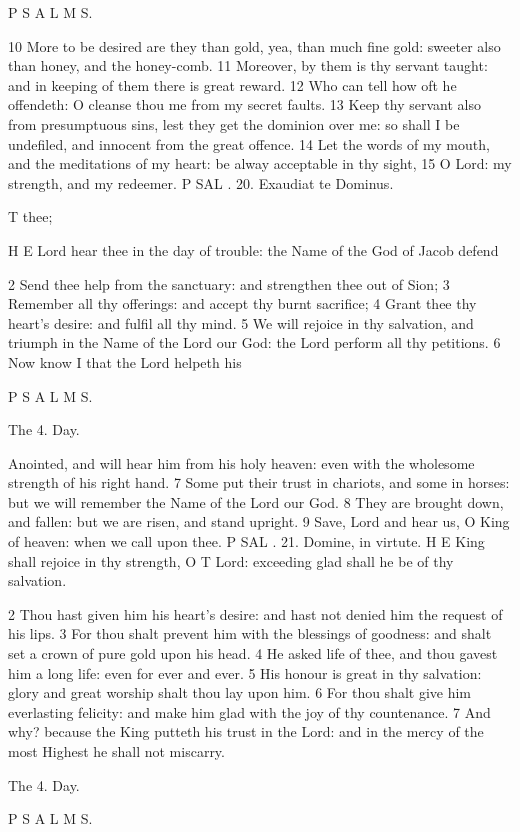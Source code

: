 P S A L M S.

10 More to be desired are they than gold, yea, than much fine gold: sweeter also than honey, and the honey-comb. 11 Moreover, by them is thy servant taught: and in keeping of them there is great reward. 12 Who can tell how oft he offendeth: O cleanse thou me from my secret faults. 13 Keep thy servant also from presumptuous sins, lest they get the dominion over me: so shall I be undefiled, and innocent from the great offence. 14 Let the words of my mouth, and the meditations of my heart: be alway acceptable in thy sight, 15 O Lord: my strength, and my redeemer. P SAL . 20. Exaudiat te Dominus.

T thee;

H E Lord hear thee in the day of trouble: the Name of the God of Jacob defend

2 Send thee help from the sanctuary: and strengthen thee out of Sion; 3 Remember all thy offerings: and accept thy burnt sacrifice; 4 Grant thee thy heart's desire: and fulfil all thy mind. 5 We will rejoice in thy salvation, and triumph in the Name of the Lord our God: the Lord perform all thy petitions. 6 Now know I that the Lord helpeth his

P S A L M S.

The 4. Day.

Anointed, and will hear him from his holy heaven: even with the wholesome strength of his right hand. 7 Some put their trust in chariots, and some in horses: but we will remember the Name of the Lord our God. 8 They are brought down, and fallen: but we are risen, and stand upright. 9 Save, Lord and hear us, O King of heaven: when we call upon thee. P SAL . 21. Domine, in virtute. H E King shall rejoice in thy strength, O T Lord: exceeding glad shall he be of thy salvation.

2 Thou hast given him his heart’s desire: and hast not denied him the request of his lips. 3 For thou shalt prevent him with the blessings of goodness: and shalt set a crown of pure gold upon his head. 4 He asked life of thee, and thou gavest him a long life: even for ever and ever. 5 His honour is great in thy salvation: glory and great worship shalt thou lay upon him. 6 For thou shalt give him everlasting felicity: and make him glad with the joy of thy countenance. 7 And why? because the King putteth his trust in the Lord: and in the mercy of the most Highest he shall not miscarry.

The 4. Day.

P S A L M S.

